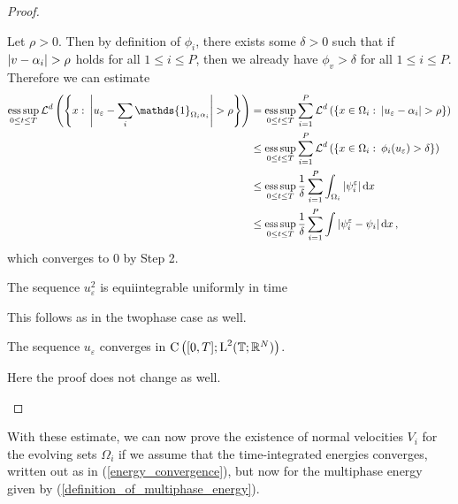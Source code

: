\begin{proof}
\begin{description}[wide=0pt]
		Let $ \rho > 0 $. Then by definition of $ \phi_{ i } $, there exists some $ \delta > 0 $ such that if  
		$ \abs{ v - \alpha_{ i } } > \rho $ holds for all $ 1 \leq i \leq P $, then we already have $ \phi_{ v } > \delta $ for all $ 1 \leq i \leq P $.
		Therefore we can estimate
		\begin{align*}
			\esssup_{ 0 \leq t \leq T }
				\lm^{ d } \left(
					\left\{
						x 
						\, \colon \,
						\abs{ u_{ \varepsilon } - \sum_{ i } \mathds{ 1 }_{ \Omega_{ i } \alpha_{ i } } } > \rho 
					\right\}
				\right)
			& = 
			\esssup_{ 0 \leq t \leq T }
				\sum_{ i = 1 }^{ P }
					\lm^{ d }
						\left(
							\left\{
								x \in \Omega_{ i }
								\, \colon \,
								\abs{ u_{ \varepsilon } - \alpha_{ i } }
								> \rho
							\right\}	
						\right)
			\\
			& \leq
				\esssup_{ 0 \leq t \leq T }
					\sum_{ i = 1 }^{ P }
						\lm^{ d } \left(
							\left\{
								x \in \Omega_{ i }
								\, \colon \,
								\phi_{ i } ( u_{ \varepsilon } ) > \delta 
							\right\}
						\right)
			\\
			& \leq
			\esssup_{ 0 \leq t \leq T }
				\frac{ 1 }{ \delta }
				\sum_{ i = 1 }^{ P }
					\int_{ \Omega_{ i } }
						\abs{ \psi_{ i }^{ \varepsilon } }
					\dd{ x }
			\\
			& \leq
			\esssup_{ 0 \leq t \leq T }
				\frac{ 1 }{ \delta }
				\sum_{ i = 1 }^{ P }
					\int
						\abs{ \psi_{ i }^{ \varepsilon } - \psi_{ i } }
					\dd{ x },
		\end{align*}
		which converges to $ 0 $ by Step 2.
		
		\item[Step 4:] The sequence $ u_{ \varepsilon }^{ 2 } $ is equiintegrable uniformly in time
		
		This follows as in the twophase case as well.
		
		\item[Step 5:] The sequence $ u_{ \varepsilon } $ converges in $ \operatorname{C} \left( [ 0 , T ] ; \operatorname{L}^{ 2 } ( \operatorname{\mathbb{T}} ; \mathbb{ R }^{ N } ) \right) $.
		
		Here the proof does not change as well.
	\end{description}
\end{proof}

With these estimate, we can now prove the existence of normal velocities $ V_{ i } $ for the evolving sets $ \Omega_{ i } $ if we assume that the time-integrated energies converges, written out as in (\ref{energy_convergence}), but now for the multiphase energy given by (\ref{definition_of_multiphase_energy}).

